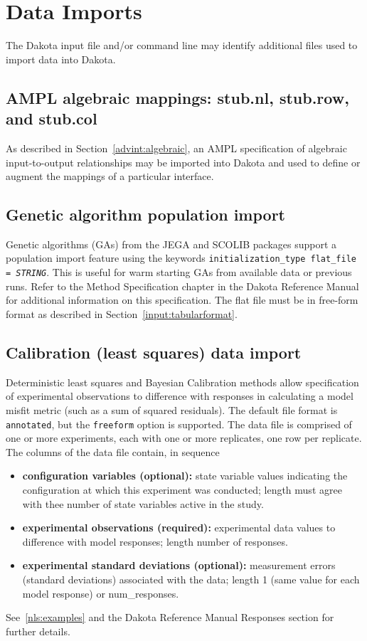 \section{Data Imports}\label{input:import}

The Dakota input file and/or command line may identify additional
files used to import data into Dakota.

\subsection{AMPL algebraic mappings: stub.nl, stub.row, and stub.col}

As described in Section~\ref{advint:algebraic}, an AMPL
specification of algebraic input-to-output relationships may be
imported into Dakota and used to define or augment the mappings of a
particular interface.

\subsection{Genetic algorithm population import}

Genetic algorithms (GAs) from the JEGA and SCOLIB packages support a
population import feature using the keywords
\texttt{initialization\_type flat\_file = \emph{STRING}}.  This is
useful for warm starting GAs from available data or previous runs.
Refer to the Method Specification chapter in the Dakota Reference
Manual~\cite{RefMan} for additional information on this specification.
The flat file must be in free-form format as described in
Section~\ref{input:tabularformat}.

\subsection{Calibration (least squares) data import}

Deterministic least squares and Bayesian Calibration methods allow
specification of experimental observations to difference with
responses in calculating a model misfit metric (such as a sum of
squared residuals).  The default file format is {\tt annotated}, but
the {\tt freeform} option is supported.  The data file is comprised of
one or more experiments, each with one or more replicates, one row per
replicate.  The columns of the data file contain, in sequence
\begin{itemize}
\item {\bf configuration variables (optional):} state variable values
  indicating the configuration at which this experiment was conducted;
  length must agree with thee number of state variables active in the
  study.
\item {\bf experimental observations (required):} experimental data
  values to difference with model responses; length number of
  responses.
\item {\bf experimental standard deviations (optional):} measurement
  errors (standard deviations) associated with the data; length 1
  (same value for each model response) or num\_responses.
\end{itemize}
See~\ref{nls:examples} and the Dakota Reference Manual Responses
section for further details.

